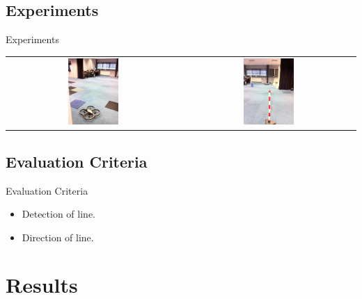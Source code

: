 \documentclass{beamer}
\begin{document}
\subsection{Experiments}
\begin{frame}
\begin{block}{Experiments}
\begin{center}
\begin{tabular}{c c}
\includegraphics[width = 0.3\textwidth]{images/experiment1.jpg} & \includegraphics[width = 0.3\textwidth]{images/experiment2.jpg}
\end{tabular}
\end{center}
\end{block}
\end{frame}

\subsection{Evaluation Criteria}
\begin{frame}
\begin{block}{Evaluation Criteria}
\begin{itemize}
\item Detection of line.
\item Direction of line.
\end{itemize}
\end{block}
\end{frame}

\section{Results}
\end{document}
